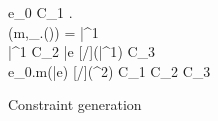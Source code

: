 \begin{figure*}[t!]
  {
    \exprok {\stdcontext} {e_0} {\tau} {C_1} \spc
    \rbar \in \A.\rhoenv \\
    \mtype(m,\bound_{\A.\aenv}(\tau)) = \inang{\rhobar \,|\, 
        \phi}\bar{\tau^1} \\
	\typeok {\A} {\inang{\rhobar \,|\,\phi}\bar{\tau^1}} {C_2}
    \spc
    \exprok {\stdcontext} {\bar{e}} {[\rbar/\rhobar](\bar{\tau^1})} {C_3}
    \\
  }
  {
    \exprok {\stdcontext} {e_0.m\inang{\rbar}(\bar{e})} 
       {[\rbar/\rhobar](\tau^2)} {C_1 \cup C_2 \cup C_3}
  }



\caption{Constraint generation}
\label{fig:constraint-gen}
\end{figure*}

